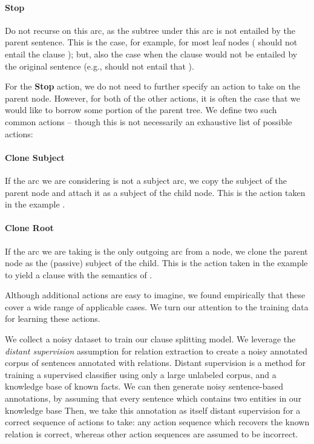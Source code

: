 \paragraph{Stop} 
  Do not recurse on this arc, as the subtree under this arc is
    not entailed by the parent sentence.
  This is the case, for example, for most leaf nodes
    ( should not entail the clause );
    but, also the case when the clause would not be entailed by the original
    sentence (e.g., 
    should not entail that ).

For the \textbf{Stop} action, we do not need to further specify an action
  to take on the parent node.
However, for both of the other actions, it is often the case that we would like
  to borrow some portion of the parent tree.
We define two such common actions -- though this is not necessarily an
  exhaustive list of possible actions:

\paragraph{Clone Subject} 
  If the arc we are considering is not a subject arc,
    we copy the subject of the parent node and attach it as a subject of the
    child node.
  This is the action taken in the example
    .

\paragraph{Clone Root} 
  If the arc we are taking is the only outgoing arc from a node, we clone the
    parent node as the (passive) subject of the child.
  This is the action taken in the example
     to yield a clause with the
    semantics of .

Although additional actions are easy to imagine, we found empirically that
  these cover a wide range of applicable cases.
We turn our attention to the training data for learning these actions.

%
%
We collect a noisy dataset to train our clause splitting model.
We leverage the \textit{distant supervision} assumption for relation extraction
  to create a noisy annotated corpus of sentences annotated with relations.
Distant supervision is a method for training a supervised classifier using only
  a large unlabeled corpus, and a knowledge base of known facts.
We can then generate noisy sentence-based annotations, by assuming that every
  sentence which contains two entities in our knowledge base 
Then, we take this annotation as itself distant supervision for a correct
  sequence of actions to take: any action sequence which recovers the 
  known relation is correct, whereas other action sequences are assumed to be
  incorrect.

